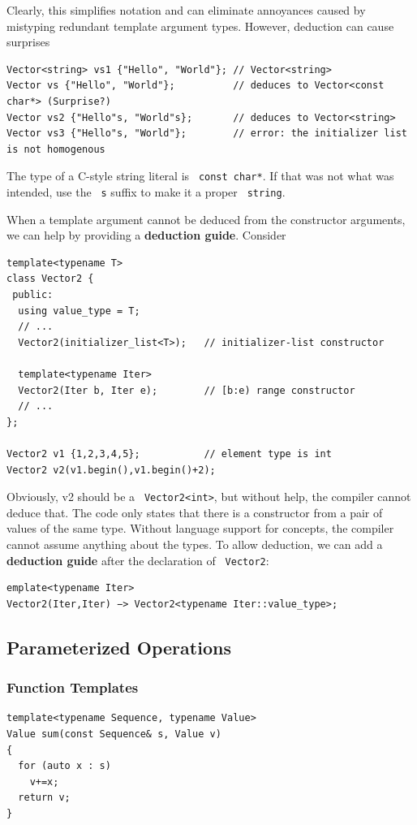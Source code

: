 \documentclass[11pt]{article}
\let\OldTexttt\texttt
\renewcommand{\texttt}[1]{\OldTexttt{\color{MidnightBlue} #1}}
\begin{document}
Clearly, this simplifies notation and can eliminate annoyances caused by mistyping redundant
template argument types. However, deduction can cause surprises
\begin{verbatim}
Vector<string> vs1 {"Hello", "World"}; // Vector<string>
Vector vs {"Hello", "World"};          // deduces to Vector<const char*> (Surprise?)
Vector vs2 {"Hello"s, "World"s};       // deduces to Vector<string>
Vector vs3 {"Hello"s, "World"};        // error: the initializer list is not homogenous
\end{verbatim}
The type of a C-style string literal is \texttt{const char*}. If that was not what was intended, use the
\texttt{s} suffix to make it a proper \texttt{string}.

When a template argument cannot be deduced from the constructor arguments, we can help by
providing a \textbf{deduction guide}. Consider
\begin{verbatim}
template<typename T>
class Vector2 {
 public:
  using value_type = T;
  // ...
  Vector2(initializer_list<T>);   // initializer-list constructor
  
  template<typename Iter>
  Vector2(Iter b, Iter e);        // [b:e) range constructor
  // ...
};

Vector2 v1 {1,2,3,4,5};           // element type is int
Vector2 v2(v1.begin(),v1.begin()+2);
\end{verbatim}

Obviously, v2 should be a \texttt{Vector2<int>}, but without help, the compiler cannot deduce that. The
code only states that there is a constructor from a pair of values of the same type. Without
language support for concepts, the compiler cannot assume anything about the types. To allow
deduction, we can add a \textbf{deduction guide} after the declaration of \texttt{Vector2}:
\begin{verbatim}
emplate<typename Iter>
Vector2(Iter,Iter) −> Vector2<typename Iter::value_type>;
\end{verbatim}
\subsection{Parameterized Operations}
\label{sec:org7f25a14}
\subsubsection{Function Templates}
\label{sec:orge66fb40}
\begin{verbatim}
template<typename Sequence, typename Value>
Value sum(const Sequence& s, Value v)
{
  for (auto x : s)
    v+=x;
  return v;
}
\end{verbatim}
\end{document}
